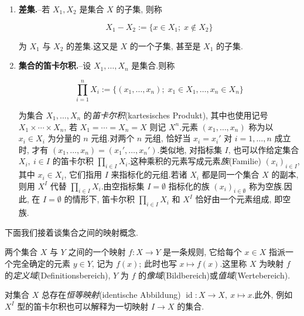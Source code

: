 \begin{enumerate}
\item[(3)] \textbf{差集.}--若 $X_1, X_2$ 是集合 $X$ 的子集, 则称

\[
X_1 - X_2 := \{x \in X_1;\; x \notin X_2\}
\]

为 $X_1$ 与 $X_2$ 的差集.这又是 $X$ 的一个子集, 甚至是 $X_1$ 的子集.

\item[(4)] \textbf{集合的笛卡尔积.}--设 $X_1, \ldots, X_n$ 是集合.则称

\[
\prod_{i = 1}^{n} X_i := \{(x_1, \ldots, x_n);\; x_1 \in X_1, \ldots, x_n \in X_n\}
\]

为集合 $X_1, \ldots, X_n$ 的\emph{笛卡尔积}(\textup{kartesisches Produkt}), 其中也使用记号 $X_1 \times \cdots \times X_n$, 若 $X_1 = \cdots = X_n = X$ 则记 $X^n$.元素 $(x_1, \ldots, x_n)$ 称为以 $x_i \in X_i$ 为分量的 $n$ 元组.对两个 $n$ 元组, 恰好当 $x_i = x_i'$ 对 $i = 1, \ldots, n$ 成立时, 才有 $(x_1, \ldots, x_n) = (x_1', \ldots, x_n')$.类似地, 对指标集 $I$, 也可以作给定集合 $X_i,\ i \in I$ 的笛卡尔积 $\prod_{i \in I} X_i$.这种乘积的元素写成元素\emph{族}(\textup{Familie}) $(x_i)_{i \in I}$, 其中 $x_i \in X_i$, 它们指用 $I$ 来指标化的元组.若诸 $X_i$ 都是同一个集合 $X$ 的副本, 则用 $X^I$ 代替 $\prod_{i \in I} X_i$.由空指标集 $I = \emptyset$ 指标化的族 $(x_i)_{i \in \emptyset}$ 称为空族.因此, 在 $I = \emptyset$ 的情形下, 笛卡尔积 $\prod_{i \in I} X_i$ 和 $X^I$ 恰好由一个元素组成, 即空族.
\end{enumerate}

下面我们接着谈集合之间的映射概念.

\begin{definition}[映射]\label{def:1.1.1}
两个集合 $X$ 与 $Y$ 之间的一个映射 $f \colon X \longrightarrow Y$ 是一条规则, 它给每个 $x \in X$ 指派一个完全确定的元素 $y \in Y$, 记为 $f(x)$; 此时也写 $x \longmapsto f(x)$.这里称 $X$ 为映射 $f$ 的\emph{定义域}(\textup{Definitionsbereich}), $Y$ 为 $f$ 的\emph{像域}(\textup{Bildbereich})或\emph{值域}(\textup{Wertebereich}).
\end{definition}

对集合 $X$ 总存在\emph{恒等映射}(\textup{identische Abbildung}) $\operatorname{id} \colon X \longrightarrow X,\ x \longmapsto x$.此外, 例如 $X^I$ 型的笛卡尔积也可以解释为一切映射 $I \longrightarrow X$ 的集合.

